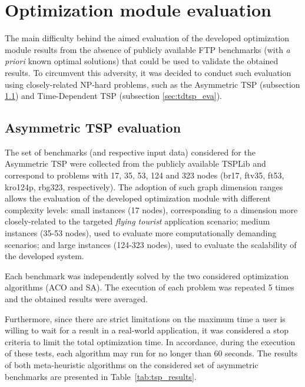\section{Optimization module evaluation}
\label{sec:os_eval}

The main difficulty behind the aimed evaluation of the developed optimization module results from the absence of publicly available FTP benchmarks (with \textit{a priori} known optimal solutions) that could be used to validate the obtained results. To circumvent this adversity, it was decided to conduct such evaluation using closely-related NP-hard problems, such as the  Asymmetric TSP (subsection \ref{sec:atsp_eval}) and Time-Dependent TSP  (subsection \ref{sec:tdtsp_eva}).

\subsection{Asymmetric TSP evaluation}
\label{sec:atsp_eval}

The set of benchmarks (and respective input data) considered for the Asymmetric TSP were collected from the publicly available TSPLib and correspond to problems with 17, 35, 53, 124 and 323 nodes (br17, ftv35, ft53, kro124p, rbg323, respectively). The adoption of such graph dimension ranges allows the evaluation of the developed optimization module with different complexity levels: small instances (17 nodes), corresponding to a dimension more closely-related to the targeted \textit{flying tourist} application scenario; medium instances (35-53 nodes), used to evaluate more computationally demanding scenarios; and large instances (124-323 nodes), used to evaluate the scalability of the developed system.

Each benchmark was independently solved by the two considered optimization algorithms (ACO and SA). The execution of each problem was repeated 5 times and the obtained results were averaged.  

Furthermore, since there are strict limitations on the maximum time a user is willing to wait for a result in a real-world application, it was considered a stop criteria to limit the total optimization time. In accordance, during the execution of these tests, each algorithm may run for no longer than 60 seconds. 
The results of both meta-heuristic algorithms on the considered set of asymmetric benchmarks are presented in Table~\ref{tab:tsp_results}. 

